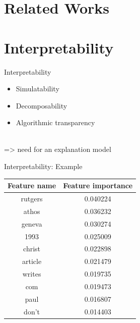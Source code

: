 \documentclass[en]{sdqbeamer}
\begin{document}
\begin{large}
\section{Related Works}

\section{Interpretability} %

\begin{frame}{Interpretability}
    \begin{itemize}
        \item Simulatability
        \pause
        \item Decomposability
        \pause
        \item Algorithmic transparency
    \end{itemize}
    \cite{lipton2017mythos} \\
    \pause
    => need for an explanation model
\end{frame}



\begin{frame}{Interpretability: Example}

    \begin{center}
            \begin{tabular}{c|c}
                Feature name & Feature importance \\ \hline
                rutgers & 0.040224 \\
                athos & 0.036232 \\
                geneva & 0.030274 \\
                1993 & 0.025009 \\
                christ & 0.022898 \\
                article & 0.021479 \\
                writes & 0.019735 \\
                com & 0.019473 \\
                paul & 0.016807 \\
                don't & 0.014403
            \end{tabular}
    \end{center}
\end{frame}


\end{large}
\end{document}
